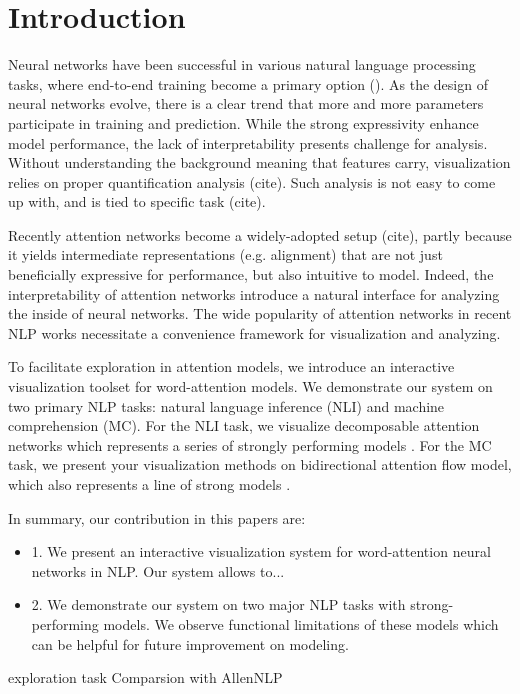 \section{Introduction}

Neural networks have been successful in various natural language processing tasks,
where end-to-end training become a primary option (\citet{Seo2016}).
As the design of neural networks evolve, there is a clear trend that more and more
parameters participate in training and prediction. While the strong expressivity
enhance model performance, the lack of interpretability presents challenge for analysis.
Without understanding the background meaning that features carry, visualization relies
on proper quantification analysis (cite). Such analysis is not easy to come up with,
and is tied to specific task (cite).


Recently attention networks become a widely-adopted setup (cite), partly because it yields
intermediate representations (e.g. alignment) that are not just beneficially expressive for performance,
but also intuitive to model. Indeed, the interpretability of attention networks introduce
a natural interface for analyzing the inside of neural networks. The wide popularity of attention networks
in recent NLP works necessitate a convenience framework for visualization and analyzing.

To facilitate exploration in attention models, we introduce an interactive visualization toolset
for word-attention models. We demonstrate our system on two primary NLP tasks: natural language
inference (NLI) and machine comprehension (MC). For the NLI task, we visualize
decomposable attention networks which represents a series of strongly performing models \cite{}.
For the MC task, we present your visualization methods on bidirectional attention flow model,
which also represents a line of strong models \cite{}.

In summary, our contribution in this papers are:
\begin{itemize}
	\item 1. We present an interactive visualization system for word-attention neural
	networks in NLP. Our system allows to...
	\item 2. We demonstrate our system on two major NLP tasks with strong-performing
	models. We observe functional limitations of these models which can be helpful
	for future improvement on modeling.
\end{itemize}


exploration task
\cite{Seo2016}
Comparsion with AllenNLP
